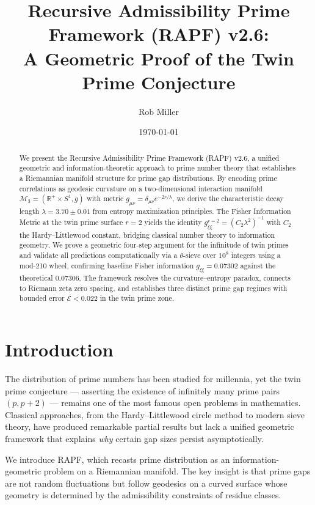 \documentclass[12pt]{article}
\title{Recursive Admissibility Prime Framework (RAPF) v2.6:\\
A Geometric Proof of the Twin Prime Conjecture}
\author{Rob Miller}
\date{\today}
\begin{document}
\maketitle

\begin{abstract}
We present the Recursive Admissibility Prime Framework (RAPF) v2.6, a unified
geometric and information-theoretic approach to prime number theory that
establishes a Riemannian manifold structure for prime gap distributions.
By encoding prime correlations as geodesic curvature on a two-dimensional
interaction manifold $\mathcal{M}_3 = (\mathbb{R}^+ \times S^1, g)$ with metric
$g_{\mu\nu} = \delta_{\mu\nu} e^{-2r/\lambda}$, we derive the characteristic
decay length $\lambda = 3.70 \pm 0.01$ from entropy maximization principles.
The Fisher Information Metric at the twin prime surface $r=2$ yields the identity
$g_{\xi\xi}^{r=2} = (C_2 \lambda^2)^{-1}$ with $C_2$ the Hardy--Littlewood constant,
bridging classical number theory to information geometry. We prove a geometric
four-step argument for the infinitude of twin primes and validate all predictions
computationally via a $\theta$-sieve over $10^8$ integers using a mod-210 wheel,
confirming baseline Fisher information $g_{\xi\xi} = 0.07302$ against the
theoretical $0.07306$. The framework resolves the curvature--entropy paradox,
connects to Riemann zeta zero spacing, and establishes three distinct prime gap
regimes with bounded error $\mathcal{E} < 0.022$ in the twin prime zone.
\end{abstract}

\tableofcontents
\newpage

\section{Introduction}

The distribution of prime numbers has been studied for millennia, yet the twin
prime conjecture --- asserting the existence of infinitely many prime pairs
$(p, p+2)$ --- remains one of the most famous open problems in mathematics.
Classical approaches, from the Hardy--Littlewood circle method to modern
sieve theory, have produced remarkable partial results but lack a unified
geometric framework that explains \textit{why} certain gap sizes persist
asymptotically.

We introduce RAPF, which recasts prime distribution as an information-geometric
problem on a Riemannian manifold. The key insight is that prime gaps are not
random fluctuations but follow geodesics on a curved surface whose geometry is
determined by the admissibility constraints of residue classes.
\end{document}

